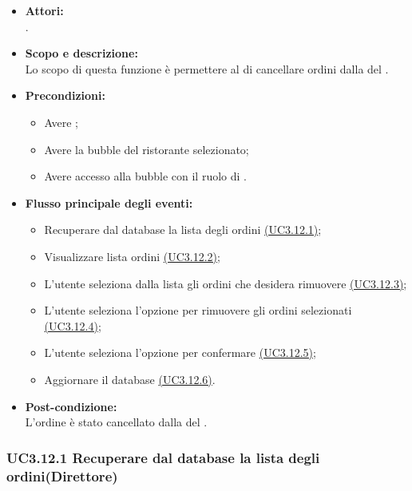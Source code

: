 \begin{itemize}
	\item \textbf{Attori:}
	\\.
	\item \textbf{Scopo e descrizione:} 
	\\Lo scopo di questa funzione è permettere al  di cancellare ordini dalla  del .
	\item \textbf{Precondizioni:}
	\begin{itemize}
		\item Avere ;
		\item Avere la bubble del ristorante selezionato;
		\item Avere accesso alla bubble con il ruolo di .
	\end{itemize}
	\item \textbf{Flusso principale degli eventi:}
	\begin{itemize}
		\item Recuperare dal database la lista degli ordini \hyperref[UC3.12.1]{(UC3.12.1)};
		\item Visualizzare lista ordini \hyperref[UC3.12.2]{(UC3.12.2)};
		\item L’utente  seleziona dalla lista gli ordini che desidera rimuovere \hyperref[UC3.12.3]{(UC3.12.3)};
		\item L’utente  seleziona l’opzione per rimuovere gli ordini selezionati \hyperref[UC3.12.4]{(UC3.12.4)};
		\item L’utente  seleziona l’opzione per confermare \hyperref[UC3.12.5]{(UC3.12.5)};
		\item Aggiornare il database \hyperref[UC3.12.6]{(UC3.12.6)}.
	\end{itemize}
	\item \textbf{Post-condizione:}
	\\L’ordine è stato cancellato dalla  del .
\end{itemize}

\subsubsection{UC3.12.1 Recuperare dal database la lista degli ordini(Direttore)} \label{UC3.12.1}

